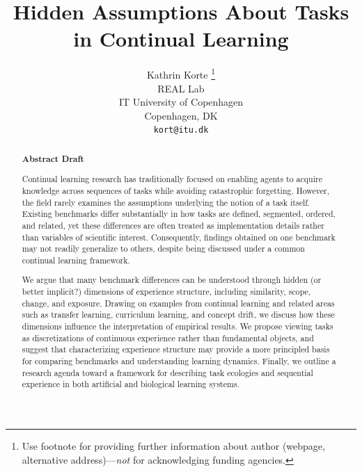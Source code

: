 \documentclass{article}
\title{Hidden Assumptions About Tasks in Continual Learning}
\author{%
  Kathrin Korte \thanks{Use footnote for providing further information
    about author (webpage, alternative address)---\emph{not} for acknowledging
    funding agencies.} \\
  REAL Lab\\
  IT University of Copenhagen\\
  Copenhagen, DK \\
  \texttt{kort@itu.dk} \\
}
\begin{document}
\maketitle


\begin{abstract}

    \textbf{Abstract Draft}
    
    Continual learning research has traditionally focused on enabling agents to acquire knowledge across sequences of tasks while avoiding catastrophic forgetting. However, the field rarely examines the assumptions underlying the notion of a task itself. Existing benchmarks differ substantially in how tasks are defined, segmented, ordered, and related, yet these differences are often treated as implementation details rather than variables of scientific interest. Consequently, findings obtained on one benchmark may not readily generalize to others, despite being discussed under a common continual learning framework.
    
    We argue that many benchmark differences can be understood through hidden (or better implicit?) dimensions of experience structure, including similarity, scope, change, and exposure. Drawing on examples from continual learning and related areas such as transfer learning, curriculum learning, and concept drift, we discuss how these dimensions influence the interpretation of empirical results. We propose viewing tasks as discretizations of continuous experience rather than fundamental objects, and suggest that characterizing experience structure may provide a more principled basis for comparing benchmarks and understanding learning dynamics. Finally, we outline a research agenda toward a framework for describing task ecologies %
    and sequential experience in both artificial and biological learning systems.

\end{abstract}



%
%
%
%
%
\end{document}
